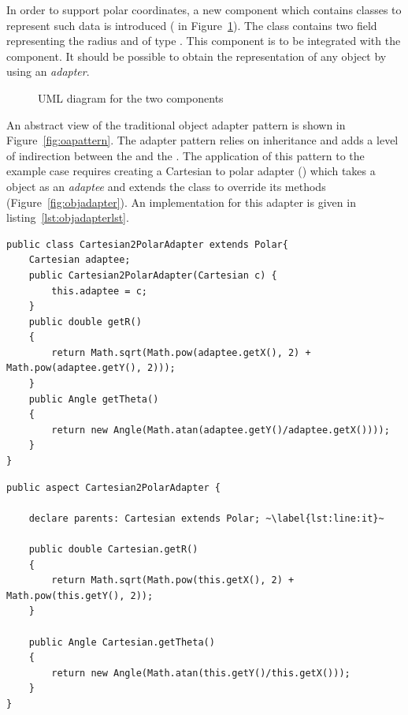 In order to support polar coordinates, a new component which contains classes to represent such data is introduced ( in Figure~\ref{fig:components}). The class  contains two field  representing the radius and  of type . This component is to be integrated with the  component. It should be possible to obtain the  representation of any  object by using an \emph{adapter}.

\begin{figure}
\centering

\label{fig:components}
\caption{UML diagram for the two components}
\end{figure}

An abstract view of the traditional object adapter pattern is shown in Figure~\ref{fig:oapattern}. The adapter pattern relies on inheritance and adds a level of indirection between the  and the . The application of this pattern to the example case requires creating a Cartesian to polar adapter () which takes a  object as an \emph{adaptee} and extends the  class to override its methods (Figure~\ref{fig:objadapter}). An implementation for this adapter is given in listing~\ref{lst:objadapterlst}.


\newsavebox{\cartesiantopolar}
\begin{lrbox}{\cartesiantopolar}
\begin{lstlisting}
public class Cartesian2PolarAdapter extends Polar{
	Cartesian adaptee;
	public Cartesian2PolarAdapter(Cartesian c) {
		this.adaptee = c;
	}
	public double getR()
	{
		return Math.sqrt(Math.pow(adaptee.getX(), 2) + Math.pow(adaptee.getY(), 2)));
	}
	public Angle getTheta()
	{
		return new Angle(Math.atan(adaptee.getY()/adaptee.getX())));
	}
}
	\end{lstlisting}
\end{lrbox}

\newsavebox{\cartesiantopolaraop}
\begin{lrbox}{\cartesiantopolaraop}
\begin{lstlisting}
public aspect Cartesian2PolarAdapter {

	declare parents: Cartesian extends Polar; ~\label{lst:line:it}~

	public double Cartesian.getR()
	{
		return Math.sqrt(Math.pow(this.getX(), 2) + Math.pow(this.getY(), 2));
	}
	
	public Angle Cartesian.getTheta()
	{
		return new Angle(Math.atan(this.getY()/this.getX()));
	}
}

	\end{lstlisting}
\end{lrbox}


